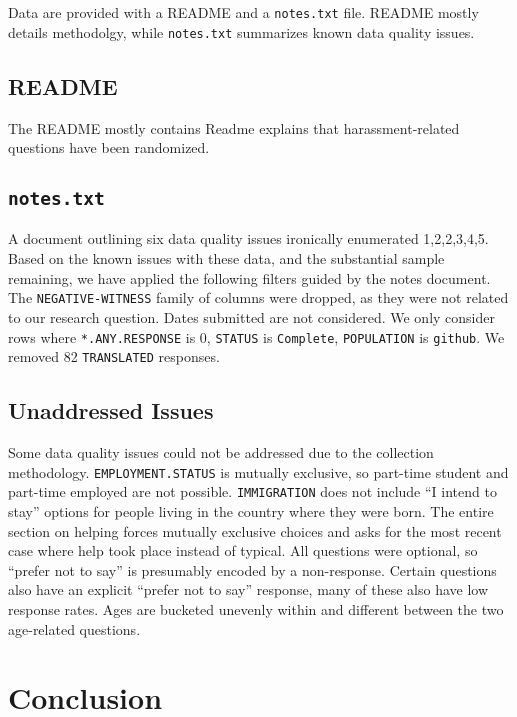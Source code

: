 \documentclass[journal,12pt,onecolumn,]{IEEEtran}
\begin{document}
Data are provided with a \textsc{README} and a \texttt{notes.txt} file.
\textsc{README} mostly details methodolgy, while \texttt{notes.txt} summarizes known data quality issues.
\subsection{\textsc{README}}

The \textsc{README} mostly contains Readme explains that harassment-related questions have been randomized.

\subsection{\texttt{notes.txt}}

A document outlining six data quality issues ironically enumerated 1,2,2,3,4,5.
Based on the known issues with these data, and the substantial sample remaining, we have applied the following filters guided by the notes document.
The \texttt{NEGATIVE-WITNESS} family of columns were dropped, as they were not related to our research question.
Dates submitted are not considered.
We only consider rows where \texttt{*.ANY.RESPONSE} is 0, \texttt{STATUS} is \texttt{Complete}, \texttt{POPULATION} is \texttt{github}.
We removed 82 \texttt{TRANSLATED} responses.

\subsection{Unaddressed Issues}

Some data quality issues could not be addressed due to the collection methodology.
\texttt{EMPLOYMENT.STATUS} is mutually exclusive, so part-time student and part-time employed are not possible.
\texttt{IMMIGRATION} does not include ``I intend to stay'' options for people living in the country where they were born.
The entire section on helping forces mutually exclusive choices and asks for the most recent case where help took place instead of typical.
All questions were optional, so ``prefer not to say'' is presumably encoded by a non-response. Certain questions also have an explicit ``prefer not to say'' response, many of these also have low response rates.
Ages are bucketed unevenly within and different between the two age-related questions.

\section{Conclusion}
\end{document}
